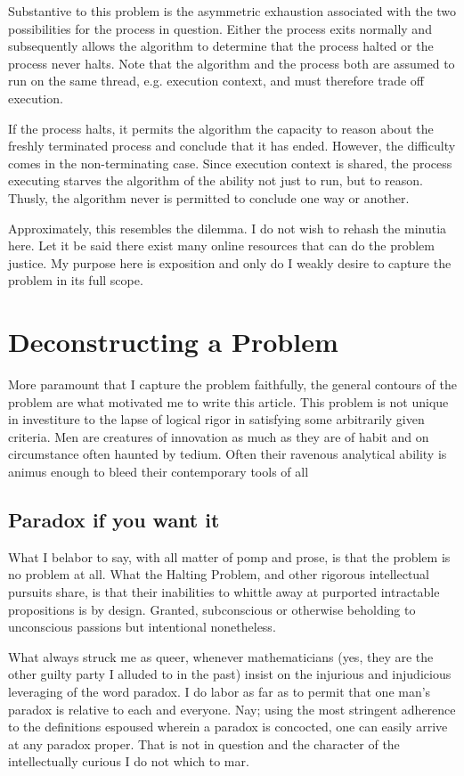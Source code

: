 \documentclass[11pt]{article}
\begin{document}
Substantive to this problem is the asymmetric exhaustion associated with the
two possibilities for the process in question. Either the process exits
normally and subsequently allows the algorithm to determine that the process
halted or the process never halts. Note that the algorithm and the process
both are assumed to run on the same thread, e.g. execution context, and must
therefore trade off execution.

If the process halts, it permits the algorithm the capacity to reason about
the freshly terminated process and conclude that it has ended. However, the
difficulty comes in the non-terminating case. Since execution context is
shared, the process executing starves the algorithm of the ability not just to
run, but to reason. Thusly, the algorithm never is permitted to conclude one
way or another.

Approximately, this resembles the dilemma. I do not wish to rehash the minutia
here. Let it be said there exist many online resources that can do the problem
justice. My purpose here is exposition and only do I weakly desire to capture
the problem in its full scope.

\section{Deconstructing a Problem}
\label{sec:orgfbf698d}
More paramount that I capture the problem faithfully, the general contours of
the problem are what motivated me to write this article. This problem is not
unique in investiture to the lapse of logical rigor in satisfying some
arbitrarily given criteria. Men are creatures of innovation as much as they
are of habit and on circumstance often haunted by tedium. Often their ravenous
analytical ability is animus enough to bleed their contemporary tools of all

\subsection{Paradox if you want it}
\label{sec:org9b143c0}
What I belabor to say, with all matter of pomp and prose, is that the problem
is no problem at all. What the Halting Problem, and other rigorous
intellectual pursuits share, is that their inabilities to whittle away at
purported intractable propositions is by design. Granted, subconscious or
otherwise beholding to unconscious passions but intentional nonetheless.

What always struck me as queer, whenever mathematicians (yes, they are the
other guilty party I alluded to in the past) insist on the injurious and
injudicious leveraging of the word paradox. I do labor as far as to permit
that one man's paradox is relative to each and everyone. Nay; using the most
stringent adherence to the definitions espoused wherein a paradox is
concocted, one can easily arrive at any paradox proper. That is not in
question and the character of the intellectually curious I do not which to
mar.
\end{document}
